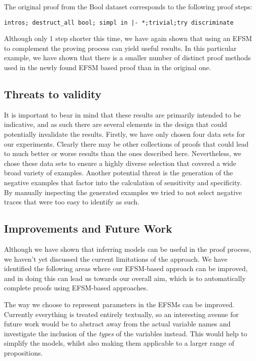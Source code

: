\documentclass{llncs}
\begin{document}
\noindent The original proof from the Bool dataset corresponds to the following proof steps:

\vspace{2mm}
\noindent\texttt{intros; destruct\_all bool; simpl in |- *;trivial;try discriminate}
\vspace{2mm}

\noindent Although only 1 step shorter this time, we have again shown that using an EFSM to complement the proving process can yield useful results. In this particular example, we have shown that there is a smaller number of distinct proof methods used in the newly found EFSM based proof than in the original one.

\subsection{Threats to validity}
It is important to bear in mind that these results are primarily intended to be indicative, and as such there are several elements in the design that could potentially invalidate the results. Firstly, we have only chosen four data sets for our experiments. Clearly there may be other collections of proofs that could lead to much better or worse results than the ones described here. Nevertheless, we chose these data sets to ensure a highly diverse selection that covered a wide broad variety of examples. Another potential threat is the generation of the negative examples that factor into the calculation of sensitivity and specificity. By manually inspecting the generated examples we tried to not select negative traces that were too easy to identify as such.

\subsection{Improvements and Future Work}
Although we have shown that inferring models can be useful in the proof process, we haven't yet discussed the current limitations of the approach. We have identified the following areas where our EFSM-based approach can be improved, and in doing this can lead us towards our overall aim, which is to automatically complete proofs using EFSM-based approaches. 

The way we choose to represent parameters in the EFSMs can be improved. Currently everything is treated entirely textually, so an interesting avenue for future work would be to abstract away from the actual variable names and investigate the inclusion of the \emph{types} of the variables instead. This would help to simplify the models, whilst also making them applicable to a larger range of propositions.
\end{document}
